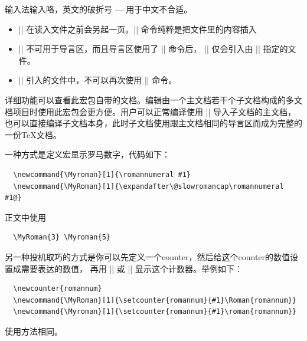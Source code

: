 
输入法输入咯，英文的破折号 --- 用于中文不合适。



\begin{itemize}
  \item || 在读入文件之前会另起一页。|| 命令纯粹是把文件里的内容插入
  \item || 不可用于导言区，而且导言区使用了 || 命令后，
  || 仅会引入由 || 指定的文件。
  \item || 引入的文件中，不可以再次使用 || 命令。
\end{itemize}



详细功能可以查看此宏包自带的文档。编辑由一个主文档若干个子文档构成的多文档项目时使用此宏包会更方便。用户可以正常编译使用
|| 导入子文档的主文档，也可以直接编译子文档本身，此时子文档使用跟主文档相同的导言区而成为完整的一份\TeX{}文档。

















一种方式是定义宏显示罗马数字，代码如下：
\begin{verbatim}
  \newcommand{\Myroman}[1]{\romannumeral #1}
  \newcommand{\MyRoman}[1]{\expandafter\@slowromancap\romannumeral #1@}
\end{verbatim}
正文中使用
\begin{verbatim}
  \MyRoman{3} \Myroman{5}
\end{verbatim}

另一种投机取巧的方式是你可以先定义一个counter，然后给这个counter的数值设置成需要表达的数值，
再用 |\Roman| 或 |\roman| 显示这个计数器。举例如下：
\begin{verbatim}
  \newcounter{romannum}
  \newcommand{\MyRoman}[1]{\setcounter{romannum}{#1}\Roman{romannum}}
  \newcommand{\Myroman}[1]{\setcounter{romannum}{#1}\roman{romannum}}
\end{verbatim}
使用方法相同。


